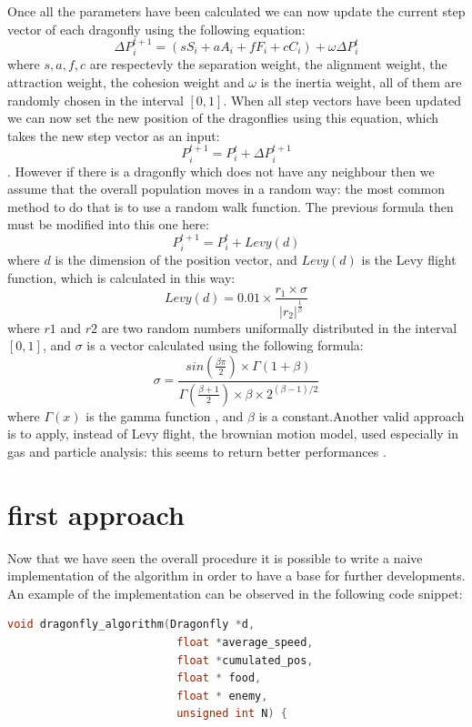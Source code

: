 \documentclass[10pt]{article}
\begin{document}
\begin{multicols}{2}
\noindent Once all the parameters have been calculated we can now update the current step vector of each dragonfly using the following equation: $$\Delta P^{t+1}_{i} = (sS_i + aA_i + fF_i + cC_i) + \omega\Delta P^t_i$$ where $s,a,f,c$ are respectevly the separation weight, the alignment weight, the attraction weight, the cohesion weight and $\omega$ is the inertia weight, all of them are randomly chosen in the interval $[0,1]$. When all step vectors have been updated we can now set the new position of the dragonflies using this equation, which takes the new step vector as an input: $$P^{t+1}_{i} = P_i^t + \Delta P_{i}^{t+1}$$. However if there is a dragonfly which does not have any neighbour then we assume that the overall population moves in a random way: the most common method to do that is to use a random walk function. The previous formula then must be modified into this one here: $$P^{t+1}_i = P_i^t + Levy(d)$$ where $d$ is the dimension of the position vector, and $Levy(d)$ is the Levy flight function, which is calculated in this way: $$Levy(d) = 0.01\times\frac{r_1 \times \sigma}{|r_2|^{\frac{1}{\beta}}}$$ where $r1$ and $r2$ are two random numbers uniformally distributed in the interval $[0,1]$, and $\sigma$ is a vector calculated using the following formula: $$\sigma = \frac{sin(\frac{\beta\pi}{2})\times\Gamma(1+\beta)}{\Gamma(\frac{\beta+1}{2})\times \beta \times 2^{(\beta-1)/2}}$$ where $\Gamma(x)$ is the gamma function \cite{WikiGamma}, and $\beta$ is a constant.Another valid approach is to apply, instead of Levy flight, the brownian motion model, used especially in gas and particle analysis: this seems to return better performances \cite{BDragonfly}. 

\section{first approach}

Now that we have seen the overall procedure it is possible to write a naive implementation of the algorithm in order to 
have a base for further developments. An example of the implementation can be observed in the following code snippet:


\begin{lstlisting}[language=C,caption={first implementation of the dragonfly algorithm}]
  void dragonfly_algorithm(Dragonfly *d,
                          float *average_speed, 
                          float *cumulated_pos, 
                          float * food, 
                          float * enemy, 
                          unsigned int N) {


\end{lstlisting}
\end{multicols}
\end{document}
